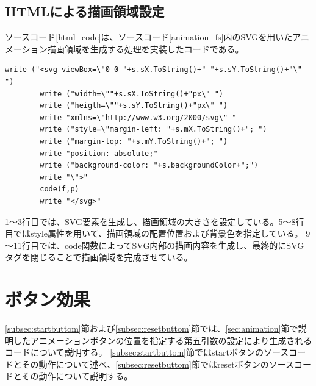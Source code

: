 \subsection{HTMLによる描画領域設定}\label{subsec:html}
ソースコード\ref{html_code}は、ソースコード\ref{animation_fs}内のSVGを用いたアニメーション描画領域を生成する処理を実装したコードである。
 \begin{lstlisting}[caption={描画領域設定（fsファイル）},label={html_code},breaklines=true,breakatwhitespace=false]
        write ("<svg viewBox=\"0 0 "+s.sX.ToString()+" "+s.sY.ToString()+"\" ")
        write ("width=\""+s.sX.ToString()+"px\" ")
        write ("heigth=\""+s.sY.ToString()+"px\" ")
        write "xmlns=\"http://www.w3.org/2000/svg\" "
        write ("style=\"margin-left: "+s.mX.ToString()+"; ")
        write ("margin-top: "+s.mY.ToString()+"; ")
        write "position: absolute;"
        write ("background-color: "+s.backgroundColor+";")
        write "\">"
        code(f,p)
        write "</svg>"
\end{lstlisting}
1～3行目では、SVG要素を生成し、描画領域の大きさを設定している。5～8行目ではstyle属性を用いて、描画領域の配置位置および背景色を指定している。
9～11行目では、code関数によってSVG内部の描画内容を生成し、最終的にSVGタグを閉じることで描画領域を完成させている。

\section{ボタン効果}\label{sec:button}
\ref{subsec:startbuttom}節および\ref{subsec:resetbuttom}節では、\ref{sec:animation}節で説明したアニメーションボタンの位置を指定する第五引数の設定により生成されるコードについて説明する。
\ref{subsec:startbuttom}節ではstartボタンのソースコードとその動作について述べ、\ref{subsec:resetbuttom}節ではresetボタンのソースコードとその動作について説明する。
